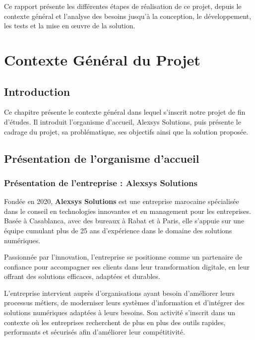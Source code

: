 \documentclass[12pt,a4paper]{report}
\begin{document}
Ce rapport présente les différentes étapes de réalisation de ce projet, depuis
le contexte général et l'analyse des besoins jusqu'à la conception, le
développement, les tests et la mise en œuvre de la solution.


\chapter{Contexte Général du Projet}

\section{Introduction}

Ce chapitre présente le contexte général dans lequel s'inscrit notre projet de
fin d'études. Il introduit l'organisme d'accueil, Alexsys Solutions, puis
présente le cadrage du projet, sa problématique, ses objectifs ainsi que la
solution proposée.

\section{Présentation de l'organisme d'accueil}

\subsection{Présentation de l'entreprise : Alexsys Solutions}

Fondée en 2020, \textbf{Alexsys Solutions} est une entreprise marocaine spécialisée dans le conseil en technologies innovantes et en management pour les entreprises. Basée à Casablanca, avec des bureaux à Rabat et à Paris, elle s'appuie sur une équipe cumulant plus de 25 ans d'expérience dans le domaine des solutions numériques.

Passionnée par l'innovation, l'entreprise se positionne comme un partenaire de confiance pour accompagner ses clients dans leur transformation digitale, en leur offrant des solutions efficaces, adaptées et durables.

L'entreprise intervient auprès d'organisations ayant besoin d'améliorer leurs
processus métiers, de moderniser leurs systèmes d'information et d'intégrer des
solutions numériques adaptées à leurs besoins. Son activité s'inscrit dans un
contexte où les entreprises recherchent de plus en plus des outils rapides,
performants et sécurisés afin d'améliorer leur compétitivité.
\end{document}
